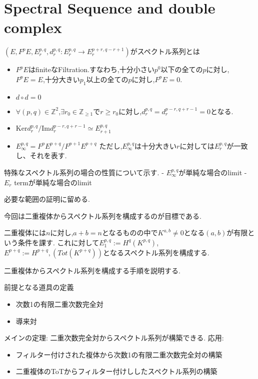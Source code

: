 \section{Spectral Sequence and double complex}
\begin{dfn}
$(E, F^pE, E^{p,q}_r, d_r^{p,q}:E_r^{p,q} \to E_r^{p+r, q-r+1})$がスペクトル系列とは
\begin{itemize}
  \item $F^pE$はfiniteなFiltration.すなわち,十分小さい$p^0$以下の全ての$p$に対し,$F^pE =E$,十分大きい$p_1$以上の全ての$p$に対し,$F^pE=0$.
  \item $d \circ d = 0$
  \item $\forall (p,q) \in \mathbb{Z}^2$,$\exists r_0 \in \mathbb{Z}_{\ge 1}$で$r \ge r_0$に対し,$d_r^{p,q} = d_r^{p-r, q+r-1} = 0$となる.
  \item $\mathrm{Ker}d_r^{p,q}/ \mathrm{Im}d_r^{p-r,q+r-1} \simeq E_{r+1}^{p,q}$
  \item $E^{p,q}_{\infty} = F^pE^{p+q}/F^{p+1}E^{p+q}$
ただし,$E_{\infty}^{p,q}$は十分大きい$r$に対しては$E_r^{p,q}$が一致し、それを表す.
\end{itemize}
\end{dfn}

特殊なスペクトル系列の場合の性質について示す.
- $E_{\infty}^{p,q}$が単純な場合のlimit
- $E_r$ termが単純な場合のlimit

必要な範囲の証明に留める.

今回は二重複体からスペクトル系列を構成するのが目標である.

二重複体には$n$に対し,$a+b=n$となるものの中で$K^{a,b}\neq 0$となる$(a,b)$が有限という条件を課す.
これに対して$E_1^{p,q}:= H^q(K^{p,q})$,$E^{p+q}:=H^{p+q},(Tot(K^{p+q}))$となるスペクトル系列を構成する.

二重複体からスペクトル系列を構成する手順を説明する.

前提となる道具の定義
\begin{itemize}
  \item 次数1の有限二重次数完全対
  \item 導来対
\end{itemize}
メインの定理: 二重次数完全対からスペクトル系列が構築できる.
応用:
\begin{itemize}
  \item フィルター付けされた複体から次数1の有限二重次数完全対の構築
  \item 二重複体のToTからフィルター付けししたスペクトル系列の構築
\end{itemize}

